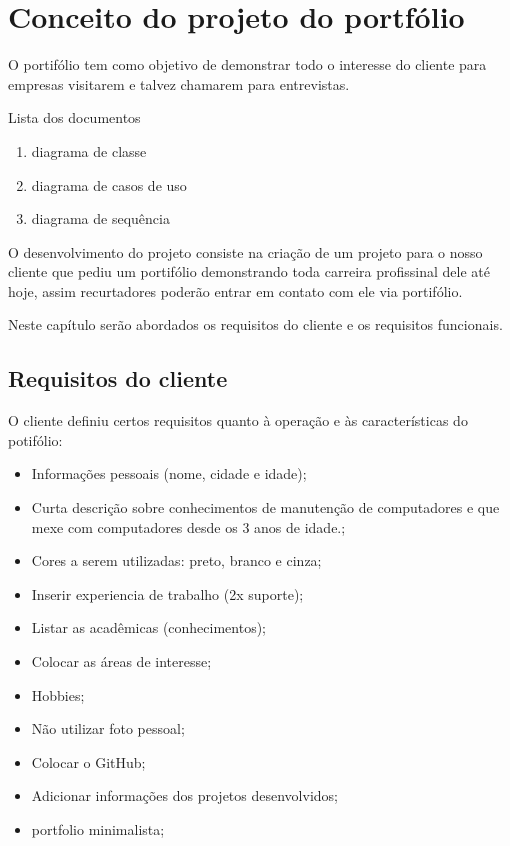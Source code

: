 \chapter{Conceito do projeto do portfólio}
\label{chap:fundteor}
O portifólio tem como objetivo de demonstrar todo o interesse do cliente para empresas visitarem e talvez chamarem para entrevistas.

Lista dos documentos
\begin{enumerate}
   \item diagrama de classe
   \item diagrama de casos de uso
   \item diagrama de sequência
\end{enumerate}

O desenvolvimento do projeto consiste na criação de um projeto para o nosso cliente que pediu um portifólio demonstrando toda carreira profissinal dele até hoje, assim recurtadores poderão entrar em contato com ele via portifólio.

Neste capítulo serão abordados os requisitos do cliente e os requisitos funcionais.



\section{Requisitos do cliente}
 O cliente definiu certos requisitos quanto à operação e às características do potifólio:
 \begin{itemize}
    \item Informações pessoais (nome, cidade e idade);
    \item Curta descrição sobre conhecimentos de manutenção de computadores e que mexe com computadores desde os 3 anos de idade.;
    \item Cores a serem utilizadas: preto, branco e cinza;
    \item Inserir experiencia de trabalho (2x suporte);
    \item Listar as acadêmicas (conhecimentos);
    \item Colocar as áreas de interesse;
    \item Hobbies;
    \item Não utilizar foto pessoal;
    \item Colocar o GitHub;
    \item Adicionar informações dos projetos desenvolvidos;
    \item portfolio minimalista;
 \end{itemize}

